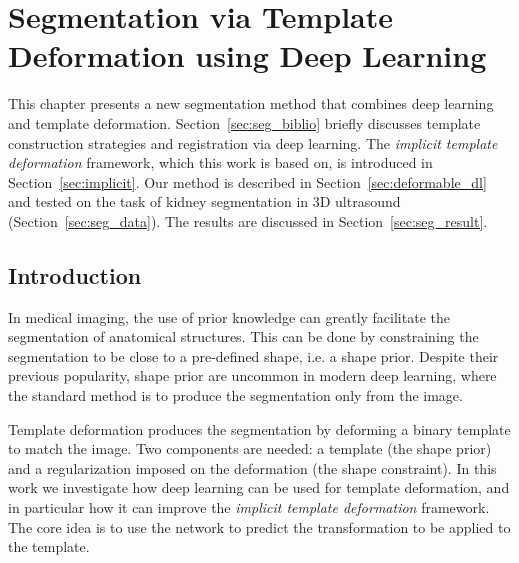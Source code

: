 \chapter{Segmentation via Template Deformation using Deep Learning}
\label{chap:seg}

\begin{chapabstract}
This chapter presents a new segmentation method that combines deep learning and template deformation.  Section~\ref{sec:seg_biblio} briefly discusses template construction strategies and registration via deep learning. The \textit{implicit template deformation} framework, which this work is based on, is introduced in Section~\ref{sec:implicit}. Our method is described in Section~\ref{sec:deformable_dl} and tested on the task of kidney segmentation in 3D ultrasound (Section~\ref{sec:seg_data}). The results are discussed in Section~\ref{sec:seg_result}.
\end{chapabstract}

\vspace{1cm}

{   
    \minitoc
}

\newpage

\section{Introduction}

In medical imaging, the use of prior knowledge can greatly facilitate the segmentation of anatomical structures. This can be done by constraining the segmentation to be close to a pre-defined shape, i.e. a shape prior. Despite their previous popularity, shape prior are uncommon in modern deep learning, where the standard method is to produce the segmentation only from the image. 

Template deformation produces the segmentation by deforming a binary template to match the image. Two components are needed: a template (the shape prior) and a regularization imposed on the deformation (the shape constraint). In this work we investigate how deep learning can be used for template deformation, and in particular how it can improve the \textit{implicit template deformation} framework. The core idea is to use the network to predict the transformation to be applied to the template.

